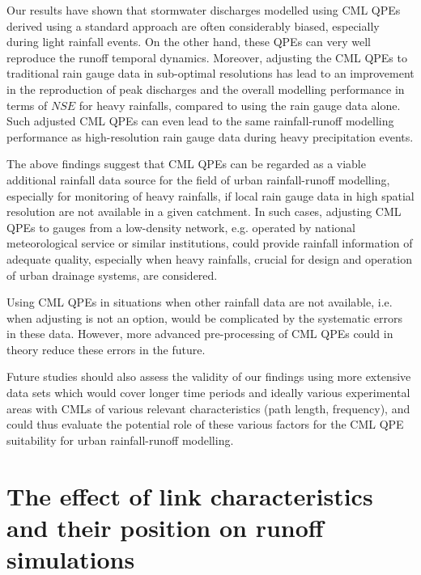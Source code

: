 \documentclass{ctuthesis}\usepackage[]{graphicx}\usepackage[]{color}
\begin{document}
Our results have shown that stormwater discharges modelled using CML QPEs derived using a standard approach are often considerably biased, especially during light rainfall events. On the other hand, these QPEs can very well reproduce the runoff temporal dynamics. Moreover, adjusting the CML QPEs to traditional rain gauge data in sub-optimal resolutions has lead to an improvement in the reproduction of peak discharges and the overall modelling performance in terms of $N\!S\!E$ for heavy rainfalls, compared to using the rain gauge data alone. Such adjusted CML QPEs can even lead to the same rainfall-runoff modelling performance as high-resolution rain gauge data during heavy precipitation events.

The above findings suggest that CML QPEs can be regarded as a viable additional rainfall data source
for the field of urban rainfall-runoff modelling, especially for monitoring of heavy rainfalls, if local rain gauge data in high spatial resolution are not available in a given catchment. In such cases, adjusting CML QPEs to gauges from a low-density network, e.g. operated by national meteorological service or similar institutions, could provide rainfall information of adequate quality, especially when heavy rainfalls, crucial for design and operation of urban drainage systems, are considered.

Using CML QPEs in situations when other rainfall data are not available, i.e. when adjusting is not an option, would be complicated by the systematic errors in these data. However, more advanced pre-processing of CML QPEs could in theory reduce these errors in the future.

Future studies should also assess the validity of our findings using more extensive data sets which would cover longer time periods and ideally various experimental areas with CMLs of various relevant characteristics (path length, frequency), and could thus evaluate the potential role of these various factors for the CML QPE suitability for urban rainfall-runoff modelling.

 




        


\chapter{The effect of link characteristics and their position on runoff simulations} \label{chap5}
\end{document}
